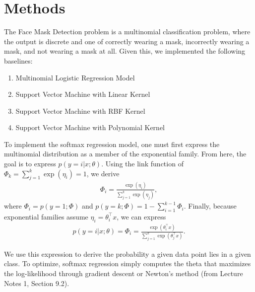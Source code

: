 \documentclass{article}
\begin{document}
\section{Methods}
The Face Mask Detection problem is a multinomial classification problem, where the output is discrete and one of correctly wearing a mask, incorrectly wearing a mask, and not wearing a mask at all. Given this, we implemented the following baselines:
\begin{enumerate}
  \item Multinomial Logistic Regression Model
  \item Support Vector Machine with Linear Kernel
  \item Support Vector Machine with RBF Kernel
  \item Support Vector Machine with Polynomial Kernel  
\end{enumerate}

To implement the softmax regression model, one must first express the multinomial distribution as a member of the exponential family. From here, the goal is to express $p(y=i|x;\theta)$. Using the link function of $\Phi_k = \sum_{j=1}^k \exp(\eta_i) = 1$, we derive
\begin{align*}
  \Phi_i = \frac{\exp(\eta_i)}{\sum_{j=1}^k \exp(\eta_j)},
\end{align*}
where $\Phi_i = p(y=1;\Phi)$ and $p(y=k;\Phi) = 1 - \sum_{i=1}^{k-1}\Phi_i$. Finally, because exponential families assume $\eta_i = \theta_i^\top x$, we can express
\begin{align*}
  p(y=i|x;\theta) = \Phi_i = \frac{\exp(\theta_i^\top x)}{\sum_{j=1}^k \exp(\theta_j^\top x)}.
\end{align*}

We use this expression to derive the probability a given data point lies in a given class. To optimize, softmax regression simply computes the theta that maximizes the log-likelihood through gradient descent or Newton’s method (from Lecture Notes 1, Section 9.2).
\end{document}

